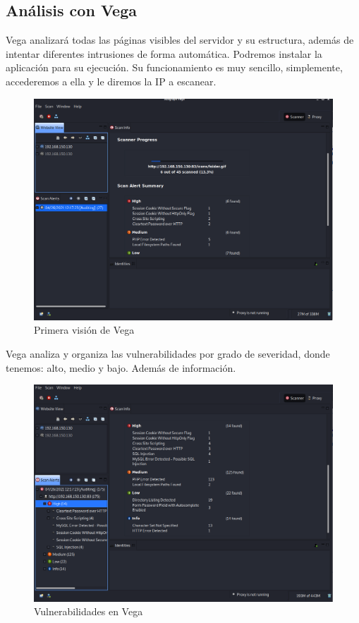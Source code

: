 \documentclass[12pt,twoside]{article}
\begin{document}
\subsection{Análisis con Vega}
Vega analizará todas las páginas visibles del servidor y su estructura, además de intentar diferentes intrusiones de forma automática.
Podremos instalar la aplicación para su ejecución. Su funcionamiento es muy sencillo, simplemente, accederemos a ella y le diremos la IP a escanear.
\begin{figure}[H]
    \centering
    \includegraphics[scale=0.35]{./imagenes/vega_1}
    \caption{Primera visión de Vega}
\end{figure}

Vega analiza y organiza las vulnerabilidades por grado de severidad, donde tenemos: alto, medio y bajo. Además de información. 
\begin{figure}[H]
    \centering
    \includegraphics[scale=0.35]{./imagenes/vega_2}
    \caption{Vulnerabilidades en Vega}
\end{figure}
\end{document}
